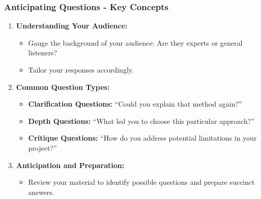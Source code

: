\documentclass[aspectratio=169]{beamer}
\begin{document}
\begin{frame}[fragile]
    \frametitle{Anticipating Questions - Key Concepts}
    \begin{enumerate}
        \item \textbf{Understanding Your Audience:}
        \begin{itemize}
            \item Gauge the background of your audience: Are they experts or general listeners?
            \item Tailor your responses accordingly.
        \end{itemize}
        
        \item \textbf{Common Question Types:}
        \begin{itemize}
            \item \textbf{Clarification Questions:} ``Could you explain that method again?''
            \item \textbf{Depth Questions:} ``What led you to choose this particular approach?''
            \item \textbf{Critique Questions:} ``How do you address potential limitations in your project?''
        \end{itemize}
        
        \item \textbf{Anticipation and Preparation:}
        \begin{itemize}
            \item Review your material to identify possible questions and prepare succinct answers.
        \end{itemize}
    \end{enumerate}
\end{frame}
\end{document}
